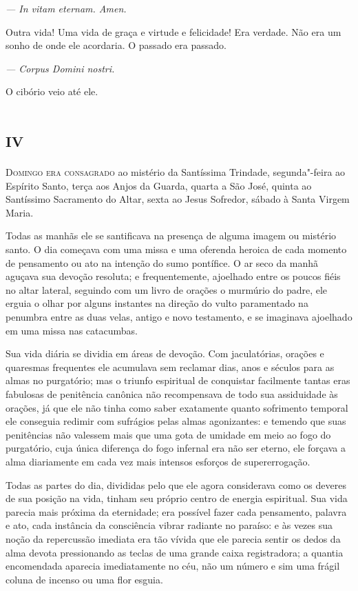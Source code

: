 {\itshape
 --- In vitam eternam. Amen.}

Outra vida! Uma vida de graça e virtude e felicidade! Era verdade. Não
era um sonho de onde ele acordaria. O passado era passado.

{\itshape
 --- Corpus Domini nostri.}

O cibório veio até ele.


\chapter{\textsc{iv}}

\textsc{Domingo era consagrado} ao mistério da Santíssima Trindade, segunda"-feira
ao Espírito Santo, terça aos Anjos da Guarda, quarta a São José, quinta
ao Santíssimo Sacramento do Altar, sexta ao Jesus Sofredor, sábado à
Santa Virgem Maria.

Todas as manhãs ele se santificava na presença de alguma imagem ou
mistério santo. O dia começava com uma missa e uma oferenda heroica de
cada momento de pensamento ou ato na intenção do sumo pontífice. O ar
seco da manhã aguçava sua devoção resoluta; e frequentemente, ajoelhado
entre os poucos fiéis no altar lateral, seguindo com um livro de
orações o murmúrio do padre, ele erguia o olhar por alguns instantes na
direção do vulto paramentado na penumbra entre as duas velas, antigo e
novo testamento, e se imaginava ajoelhado em uma missa nas catacumbas.

Sua vida diária se dividia em áreas de devoção. Com jaculatórias,
orações e quaresmas frequentes ele acumulava sem reclamar dias, anos e
séculos para as almas no purgatório; mas o triunfo espiritual de
conquistar facilmente tantas eras fabulosas de penitência canônica não
recompensava de todo sua assiduidade às orações, já que ele não tinha
como saber exatamente quanto sofrimento temporal ele conseguia redimir
com sufrágios pelas almas agonizantes: e temendo que suas penitências
não valessem mais que uma gota de umidade em meio ao fogo do
purgatório, cuja única diferença do fogo infernal era não ser eterno,
ele forçava a alma diariamente em cada vez mais intensos esforços de
supererrogação.

Todas as partes do dia, divididas pelo que ele agora considerava como os
deveres de sua posição na vida, tinham seu próprio centro de energia
espiritual. Sua vida parecia mais próxima da eternidade; era possível
fazer cada pensamento, palavra e ato, cada instância da consciência
vibrar radiante no paraíso: e às vezes sua noção da repercussão
imediata era tão vívida que ele parecia sentir os dedos da alma devota
pressionando as teclas de uma grande caixa registradora; a quantia
encomendada aparecia imediatamente no céu, não um número e sim uma
frágil coluna de incenso ou uma flor esguia.


